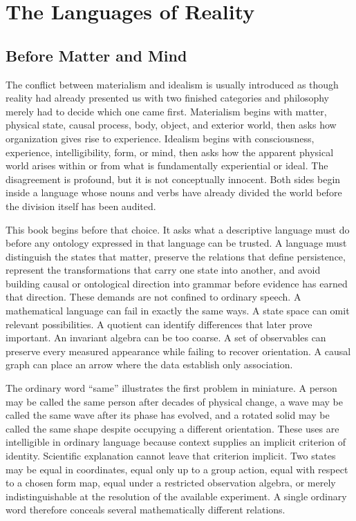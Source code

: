 \chapter{The Languages of Reality}

\section{Before Matter and Mind}

The conflict between materialism and idealism is usually introduced as though reality had already presented us with two finished categories and philosophy merely had to decide which one came first. Materialism begins with matter, physical state, causal process, body, object, and exterior world, then asks how organization gives rise to experience. Idealism begins with consciousness, experience, intelligibility, form, or mind, then asks how the apparent physical world arises within or from what is fundamentally experiential or ideal. The disagreement is profound, but it is not conceptually innocent. Both sides begin inside a language whose nouns and verbs have already divided the world before the division itself has been audited.

This book begins before that choice. It asks what a descriptive language must do before any ontology expressed in that language can be trusted. A language must distinguish the states that matter, preserve the relations that define persistence, represent the transformations that carry one state into another, and avoid building causal or ontological direction into grammar before evidence has earned that direction. These demands are not confined to ordinary speech. A mathematical language can fail in exactly the same ways. A state space can omit relevant possibilities. A quotient can identify differences that later prove important. An invariant algebra can be too coarse. A set of observables can preserve every measured appearance while failing to recover orientation. A causal graph can place an arrow where the data establish only association.

The ordinary word ``same'' illustrates the first problem in miniature. A person may be called the same person after decades of physical change, a wave may be called the same wave after its phase has evolved, and a rotated solid may be called the same shape despite occupying a different orientation. These uses are intelligible in ordinary language because context supplies an implicit criterion of identity. Scientific explanation cannot leave that criterion implicit. Two states may be equal in coordinates, equal only up to a group action, equal with respect to a chosen form map, equal under a restricted observation algebra, or merely indistinguishable at the resolution of the available experiment. A single ordinary word therefore conceals several mathematically different relations.


